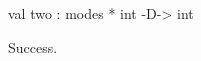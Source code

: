 \chklistingtrue
{}
\begin{ChkListingMsg}
val two : modes * int -D-> int
\end{ChkListingMsg}
\begin{ChkListingErr}
Success.
\end{ChkListingErr}
